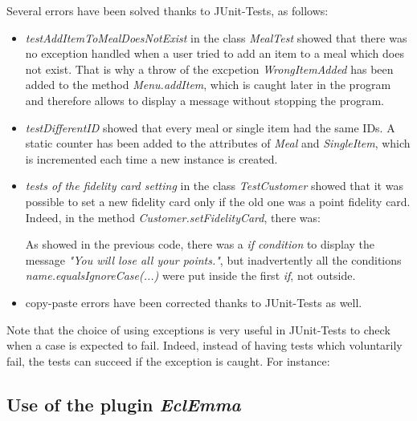 Several errors have been solved thanks to JUnit-Tests, as follows:
\begin{itemize}
	\item{\textit{testAddItemToMealDoesNotExist}} in the class \textit{MealTest} showed that there was no exception handled when a user tried to add an item to a meal which does not exist. That is why a throw of the excpetion \textit{WrongItemAdded} has been added to the method \textit{Menu.addItem}, which is caught later in the program and therefore allows to display a message without stopping the program.
	\item{\textit{testDifferentID}} showed that every meal or single item had the same IDs. A static counter has been added to the attributes of \textit{Meal} and \textit{SingleItem}, which is incremented each time a new instance is created.
	\item{\textit{tests of the fidelity card setting}} in the class \textit{TestCustomer} showed that it was possible to set a new fidelity card only if the old one was a point fidelity card. Indeed, in the method \textit{Customer.setFidelityCard}, there was:

As showed in the previous code, there was a \textit{if condition} to display the message \textit{"You will lose all your points."}, but inadvertently all the conditions \textit{name.equalsIgnoreCase(...)} were put inside the first \textit{if}, not outside.
	\item{} copy-paste errors have been corrected thanks to JUnit-Tests as well.
\end{itemize}
Note that the choice of using exceptions is very useful in JUnit-Tests to check when a case is expected to fail. Indeed, instead of having tests which voluntarily fail, the tests can succeed if the exception is caught. For instance:



\subsection{Use of the plugin \textit{EclEmma}}
\label{sub:use_of_the_plugin_EclEmma}

